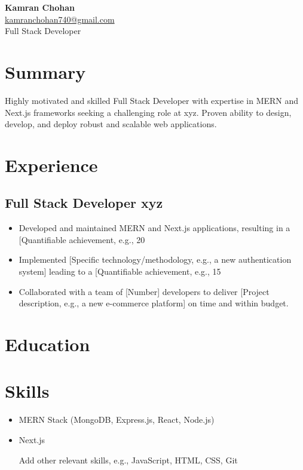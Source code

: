 \documentclass[11pt,a4paper]{article}
\begin{document}
\begin{center}
    {\Huge \textbf{Kamran Chohan}} \\
    \href{mailto:kamranchohan740@gmail.com}{kamranchohan740@gmail.com} \\
    Full Stack Developer
\end{center}

\vspace{1cm}

\section{Summary}
Highly motivated and skilled Full Stack Developer with expertise in MERN and Next.js frameworks seeking a challenging role at xyz.  Proven ability to design, develop, and deploy robust and scalable web applications.

\section{Experience}

\subsection{Full Stack Developer \hspace{1cm} xyz}
\begin{itemize}[nosep]
    \item Developed and maintained MERN and Next.js applications, resulting in a [Quantifiable achievement, e.g., 20%
    \item Implemented [Specific technology/methodology, e.g.,  a new authentication system] leading to a [Quantifiable achievement, e.g., 15%
    \item Collaborated with a team of [Number] developers to deliver [Project description, e.g.,  a new e-commerce platform] on time and within budget.
\end{itemize}


\section{Education}



\section{Skills}
\begin{itemize}[nosep]
    \item MERN Stack (MongoDB, Express.js, React, Node.js)
    \item Next.js
    \item [Add other relevant skills, e.g.,  JavaScript, HTML, CSS, Git]
\end{itemize}
\end{document}
